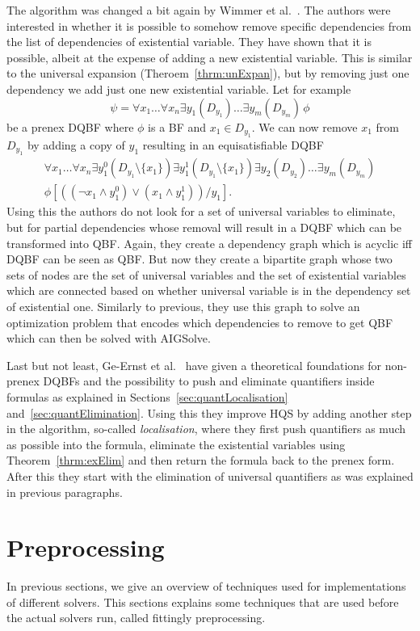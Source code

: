 \documentclass[
  digital, %
  color,
  twoside, %
  table,   %
  nolof,     %
  nolot,     %
]{fithesis3}
\theoremstyle{definition}
\theoremstyle{remark}
\newcommand{\itholds}{\,}
\begin{document}
The algorithm was changed a bit again by Wimmer et al.~\cite{HQSdependencyElimination}. The authors were interested in whether it is possible to somehow remove specific dependencies from the list of dependencies of existential variable. They have shown that it is possible, albeit at the expense of adding a new existential variable. This is similar to the universal expansion (Theroem~\ref{thrm:unExpan}), but by removing just one dependency we add just one new existential variable. Let for example
\[\psi = \forall x_1 \dots \forall x_n \exists y_1(D_{y_1}) \dots \exists y_m(D_{y_m}) \itholds \phi\]
be a prenex DQBF where $\phi$ is a BF and $x_1 \in D_{y_1}$. We can now remove $x_1$ from $D_{y_1}$ by adding a copy of $y_1$ resulting in an equisatisfiable DQBF
\begin{multline*}
\forall x_1 \dots \forall x_n \exists y_1^0(D_{y_1} \setminus \{x_1\}) \exists y_1^1(D_{y_1} \setminus \{x_1\}) \exists y_2(D_{y_2})\dots \exists y_m(D_{y_m}) \\
\phi\left[((\neg x_1 \land y_1^0) \lor (x_1 \land y_1^1))/y_1\right].
\end{multline*}
Using this the authors do not look for a set of universal variables to eliminate, but for partial dependencies whose removal will result in a DQBF which can be transformed into QBF. Again, they create a dependency graph which is acyclic iff DQBF can be seen as QBF. But now they create a bipartite graph whose two sets of nodes are the set of universal variables and the set of existential variables which are connected based on whether universal variable is in the dependency set of existential one. Similarly to previous, they use this graph to solve an optimization problem that encodes which dependencies to remove to get QBF which can then be solved with AIGSolve.

Last but not least, Ge-Ernst et al.~\cite{HQSquantifierLocalisation} have given a theoretical foundations for non-prenex DQBFs and the possibility to push and eliminate quantifiers inside formulas as explained in Sections~\ref{sec:quantLocalisation} and~\ref{sec:quantElimination}. Using this they improve HQS by adding another step in the algorithm, so-called \emph{localisation}, where they first push quantifiers as much as possible into the formula, eliminate the existential variables using Theorem~\ref{thrm:exElim} and then return the formula back to the prenex form. After this they start with the elimination of universal quantifiers as was explained in previous paragraphs.

\section{Preprocessing}
\label{sec:preprocessing}
In previous sections, we give an overview of techniques used for implementations of different solvers. This sections explains some techniques that are used before the actual solvers run, called fittingly preprocessing.
\end{document}
